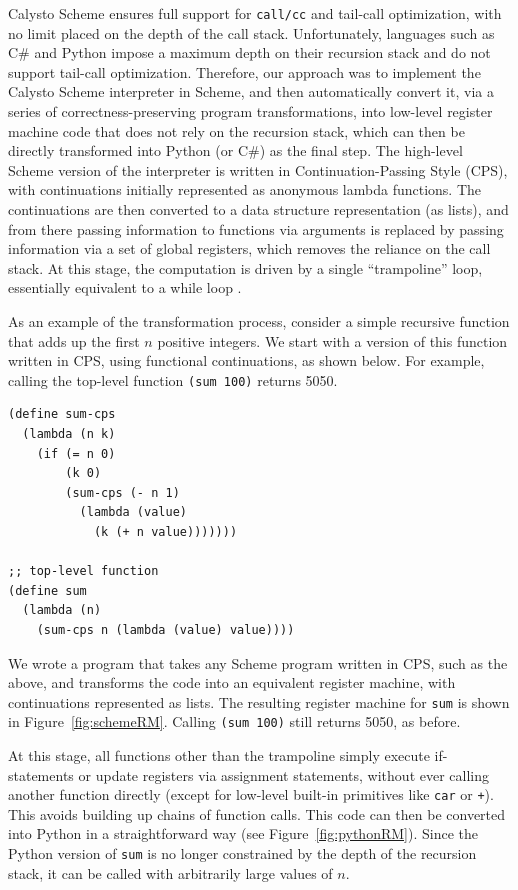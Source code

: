 \documentclass[acmsmall,screen,authorversion]{acmart}
\begin{document}
Calysto Scheme ensures full support for \texttt{call/cc} and tail-call
optimization, with no limit placed on the depth of the call stack.
Unfortunately, languages such as C\# and Python impose a maximum depth on their
recursion stack and do not support tail-call optimization.  Therefore, our
approach was to implement the Calysto Scheme interpreter in Scheme, and then
automatically convert it, via a series of correctness-preserving program
transformations, into low-level register machine code that does not rely on the
recursion stack, which can then be directly transformed into Python (or C\#) as
the final step.  The high-level Scheme version of the interpreter is written in
Continuation-Passing Style (CPS), with continuations initially represented as
anonymous lambda functions.  The continuations are then converted to a data
structure representation (as lists), and from there passing information to
functions via arguments is replaced by passing information via a set of global
registers, which removes the reliance on the call stack.  At this stage, the
computation is driven by a single ``trampoline'' loop, essentially equivalent
to a while loop \cite{Ganz99, EOPL3}.

As an example of the transformation process, consider a simple recursive
function that adds up the first $n$ positive integers.  We start with a version
of this function written in CPS, using functional continuations, as shown
below.  For example, calling the top-level function \texttt{(sum 100)} returns
5050.

{\small
\begin{verbatim}
(define sum-cps
  (lambda (n k)
    (if (= n 0)
        (k 0)
        (sum-cps (- n 1)
          (lambda (value)
            (k (+ n value)))))))

;; top-level function
(define sum
  (lambda (n)
    (sum-cps n (lambda (value) value))))
\end{verbatim}
}

\noindent
We wrote a program that takes any Scheme program written in CPS, such as the
above, and transforms the code into an equivalent register machine, with
continuations represented as lists.  The resulting register machine for
\texttt{sum} is shown in Figure~\ref{fig:schemeRM}.  Calling \texttt{(sum 100)}
still returns 5050, as before.

At this stage, all functions other than the trampoline simply execute
if-statements or update registers via assignment statements, without ever
calling another function directly (except for low-level built-in primitives
like \texttt{car} or \texttt{+}).  This avoids building up chains of function
calls.  This code can then be converted into Python in a straightforward way
(see Figure~\ref{fig:pythonRM}).  Since the Python version of \texttt{sum} is
no longer constrained by the depth of the recursion stack, it can be called
with arbitrarily large values of $n$.
\end{document}

